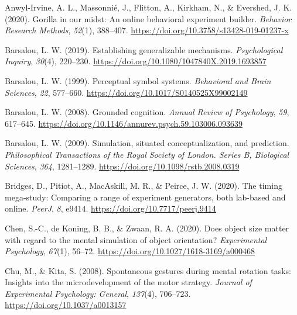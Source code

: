 \documentclass[
  man]{apa7}
\newlength{\cslhangindent}
\newlength{\cslentryspacingunit} %
\newenvironment{CSLReferences}[2] %
 {%
  \setlength{\parindent}{0pt}
  \ifodd #1
  \let\oldpar\par
  \def\par{\hangindent=\cslhangindent\oldpar}
  \fi
  \setlength{\parskip}{#2\cslentryspacingunit}
 }%
 {}
\begin{document}
\hypertarget{refs}{}
\begin{CSLReferences}{1}{0}
\leavevmode{}%
Anwyl-Irvine, A. L., Massonnié, J., Flitton, A., Kirkham, N., \& Evershed, J. K. (2020). Gorilla in our midst: {An} online behavioral experiment builder. \emph{Behavior Research Methods}, \emph{52}(1), 388--407. \url{https://doi.org/10.3758/s13428-019-01237-x}

\leavevmode{}%
Barsalou, L. W. (2019). Establishing generalizable mechanisms. \emph{Psychological Inquiry}, \emph{30}(4), 220--230. \url{https://doi.org/10.1080/1047840X.2019.1693857}

\leavevmode{}%
Barsalou, L. W. (1999). Perceptual symbol systems. \emph{Behavioral and Brain Sciences}, \emph{22}, 577--660. \url{https://doi.org/10.1017/S0140525X99002149}

\leavevmode{}%
Barsalou, L. W. (2008). Grounded cognition. \emph{Annual Review of Psychology}, \emph{59}, 617--645. \url{https://doi.org/10.1146/annurev.psych.59.103006.093639}

\leavevmode{}%
Barsalou, L. W. (2009). Simulation, situated conceptualization, and prediction. \emph{Philosophical Transactions of the Royal Society of London. Series B, Biological Sciences}, \emph{364}, 1281--1289. \url{https://doi.org/10.1098/rstb.2008.0319}

\leavevmode{}%
Bridges, D., Pitiot, A., MacAskill, M. R., \& Peirce, J. W. (2020). The timing mega-study: Comparing a range of experiment generators, both lab-based and online. \emph{PeerJ}, \emph{8}, e9414. \url{https://doi.org/10.7717/peerj.9414}

\leavevmode{}%
Chen, S.-C., de Koning, B. B., \& Zwaan, R. A. (2020). Does object size matter with regard to the mental simulation of object orientation? \emph{Experimental Psychology}, \emph{67}(1), 56--72. \url{https://doi.org/10.1027/1618-3169/a000468}

\leavevmode{}%
Chu, M., \& Kita, S. (2008). Spontaneous gestures during mental rotation tasks: {Insights} into the microdevelopment of the motor strategy. \emph{Journal of Experimental Psychology: General}, \emph{137}(4), 706--723. \url{https://doi.org/10.1037/a0013157}


\end{CSLReferences}
\end{document}

